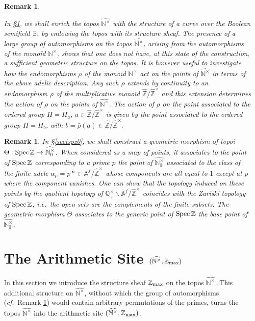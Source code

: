 \documentclass[noams,lp]{compositio}
\newtheorem{rem}[thm]{Remark}
\def\Spec{{\rm Spec\,}}
\def\A{{\mathbb A}}
\def\B{{\mathbb B}}
\def\N{{\mathbb N}}
\def\Q{{\mathbb Q}}
\def\Z{{\mathbb Z}}
\newcommand{\ie}{{\it i.e.\/}\ }
\newcommand{\cf}{{\it cf.}}
\def\zmax{{\Z_{\rm max}}}
\def\arith{{(\wnt,\bar \N)}}
\def\nt{\N^{\times}}
\def\wnt{{\widehat{\N^{\times}}}}
\def\nto{\N_0^{\times}}
\def\wnto{{\widehat{\nto}}}
\def\arith{{(\wnt,\zmax)}}
\def\hatz{{\hat\Z^\times}}
\begin{document}
\begin{rem}\label{permsect}{\rm 

In  \S \ref{sectarithsite}, we shall enrich the topos  $\widehat{ \N^\times} $ with the structure of a curve over the Boolean semifield $\B$, by  endowing the topos with its structure sheaf.  The presence of a large group of automorphisms on the topos $\wnt$, arising from the automorphisms of the mono\"{i}d $\nt$, shows that one does not have, at this state of the construction, a sufficient geometric structure on the topos. It is however useful to investigate how the endomorphisms $\rho$ of the mono\" id $ \N^\times$ act on the  points of  $\widehat{ \N^\times}$ in terms of the above adelic description.
Any such  $\rho$ extends by continuity to  an endomorphism $\bar \rho$ of the multiplicative mono\" id $\hat \Z/\hatz$ and this extension determines the action of  $\rho$ on the  points of  $\wnt$.
The action of $\rho$ on the point associated  to the ordered group  $H=H_a$,  $a\in \hat \Z/\hatz$ is given by the point associated  to the ordered group  $H=H_b$, with  $b=\bar \rho(a)\in \hat \Z/\hatz$.
}\end{rem}

\begin{rem}\label{topspec}{\rm In \S \ref{sectspz0}, we shall construct a geometric morphism of topoi $\Theta:\Spec\Z\to\wnto$. When considered as a map of points, it associates to the point of $\Spec\Z$ corresponding to 
 a prime $p$ the point of $\wnto$ associated to the class of  the finite adele $\alpha_p=p^\infty\in\A^f/\hatz$  whose components are all equal to $1$ except at $p$ where the component vanishes. One can show that the topology induced on these points by the quotient topology of $\Q_+^\times\backslash\A^f/\hatz$ coincides with the Zariski topology of $\Spec\Z$, \ie the open sets are the complements of the finite subsets. The geometric morphism $\Theta$ associates to the generic point of $\Spec\Z$ the base  point of $\wnto$.
}\end{rem}

\section{The Arithmetic Site $\arith$}\label{sectarithsite}
In this section we introduce  the structure  sheaf $\zmax$ on the topos $\wnt$. This additional structure on  $\wnt$, without which the group of automorphisms (\cf~Remark \ref{permsect}) would contain arbitrary permutations of the primes, turns the topos $\wnt$ into the arithmetic site $\arith$.
\end{document}
